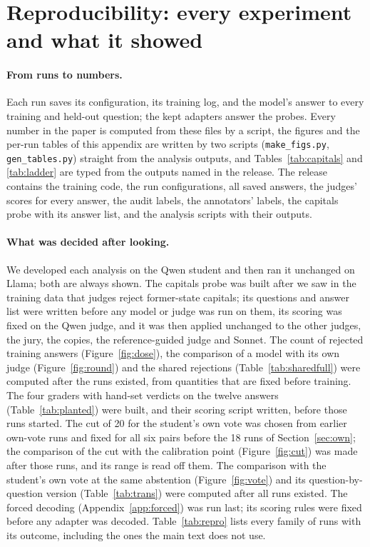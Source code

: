 \documentclass[11pt,a4paper,twocolumn]{article}
\begin{document}
\section{Reproducibility: every experiment and what it showed}
\label{app:repro}

\paragraph{From runs to numbers.} Each run saves its configuration, its training log, and the model's answer to every training and held-out question; the kept adapters answer the probes. Every number in the paper is computed from these files by a script, the figures and the per-run tables of this appendix are written by two scripts (\texttt{make\_figs.py}, \texttt{gen\_tables.py}) straight from the analysis outputs, and Tables~\ref{tab:capitals} and \ref{tab:ladder} are typed from the outputs named in the release. The release contains the training code, the run configurations, all saved answers, the judges' scores for every answer, the audit labels, the annotators' labels, the capitals probe with its answer list, and the analysis scripts with their outputs.

\paragraph{What was decided after looking.} We developed each analysis on the Qwen student and then ran it unchanged on Llama; both are always shown. The capitals probe was built after we saw in the training data that judges reject former-state capitals; its questions and answer list were written before any model or judge was run on them, its scoring was fixed on the Qwen judge, and it was then applied unchanged to the other judges, the jury, the copies, the reference-guided judge and Sonnet. The count of rejected training answers (Figure~\ref{fig:dose}), the comparison of a model with its own judge (Figure~\ref{fig:round}) and the shared rejections (Table~\ref{tab:sharedfull}) were computed after the runs existed, from quantities that are fixed before training. The four graders with hand-set verdicts on the twelve answers (Table~\ref{tab:planted}) were built, and their scoring script written, before those runs started. The cut of 20 for the student's own vote was chosen from earlier own-vote runs and fixed for all six pairs before the 18 runs of Section~\ref{sec:own}; the comparison of the cut with the calibration point (Figure~\ref{fig:cut}) was made after those runs, and its range is read off them. The comparison with the student's own vote at the same abstention (Figure~\ref{fig:vote}) and its question-by-question version (Table~\ref{tab:trans}) were computed after all runs existed. The forced decoding (Appendix~\ref{app:forced}) was run last; its scoring rules were fixed before any adapter was decoded. Table~\ref{tab:repro} lists every family of runs with its outcome, including the ones the main text does not use.
\end{document}
